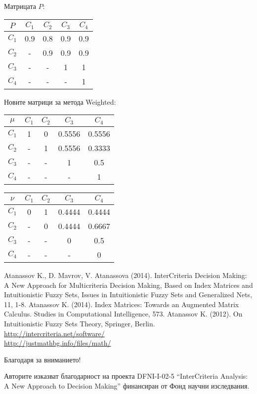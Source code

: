 \documentclass{beamer}
\begin{document}
\begin{frame}
Матрицата $P$:
\begin{center}
\begin{tabular}{c|cccc}
$P$ & $C_1$ & $C_2$ & $C_3$ & $C_4$ \\
\hline $C_1$ & 0.9 & 0.8 & 0.9 & 0.9 \\
$C_2$ & - & 0.9 & 0.9 & 0.9 \\
$C_3$ & - & - & 1 & 1 \\
$C_4$ & - & - & - & 1
\end{tabular}
\end{center}

Новите матрици за метода Weighted:
\begin{center}
\begin{minipage}[b]{0.48\linewidth}
\begin{tabular}{c|cccc}
$\mu$ & $C_1$ & $C_2$ & $C_3$ & $C_4$ \\
\hline $C_1$ & 1 & 0 & 0.5556 & 0.5556 \\
$C_2$ & - & 1 & 0.5556 & 0.3333 \\
$C_3$ & - & - & 1 & 0.5 \\
$C_4$ & - & - & - & 1
\end{tabular}
\end{minipage}
\begin{minipage}[b]{0.48\linewidth}
\begin{tabular}{c|cccc}
$\nu$ & $C_1$ & $C_2$ & $C_3$ & $C_4$ \\
\hline $C_1$ & 0 & 1 & 0.4444 & 0.4444 \\
$C_2$ & - & 0 & 0.4444 & 0.6667 \\
$C_3$ & - & - & 0 & 0.5 \\
$C_4$ & - & - & - & 0
\end{tabular}
\end{minipage}
\end{center}
\end{frame}


\begin{frame}
\begin{thebibliography}{9}
 Atanassov K., D. Mavrov, V. Atanassova (2014). InterCriteria Decision Making: A New Approach for Multicriteria Decision Making, Based on Index Matrices and Intuitionistic Fuzzy Sets, Issues in Intuitionistic Fuzzy Sets and Generalized Nets, 11, 1-8.
 Atanassov K. (2014). Index Matrices: Towards an Augmented Matrix Calculus. Studies in Computational Intelligence, 573.
 Atanassov K. (2012). On Intuitionistic Fuzzy Sets Theory, Springer, Berlin.
 \url{http://intercriteria.net/software/}\\
\url{http://justmathbg.info/files/math/}
\end{thebibliography}
\end{frame}


\begin{frame}
\begin{center}
Благодаря за вниманието!
\end{center}

\vfill
Авторите изказват благодарност на проекта DFNI-I-02-5 ``InterCriteria Analysis: A New Approach to Decision Making''
финансиран от Фонд научни изследвания.
\end{frame}
\end{document}
